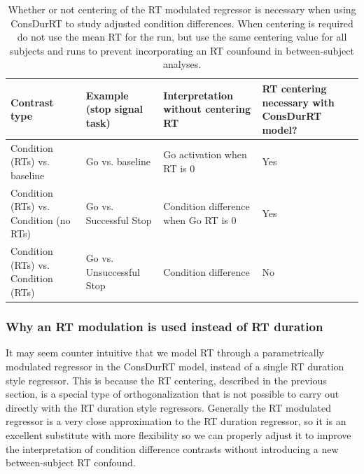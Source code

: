 \documentclass[titlepage,12pt] {article}
\begin{document}
\begin{table}[h!]
  \begin{center}
   \begin{tabular}{|L{4cm}|L{3.25cm}|L{3.9cm}|L{3.7cm}|} \hline
      Contrast type & Example  \newline (stop signal task) & Interpretation without centering RT & RT centering necessary with ConsDurRT model? \\ \hline\hline
      Condition (RTs) vs. baseline & Go  vs. \newline baseline & Go activation when RT is 0 & Yes \\ \hline
      Condition (RTs) vs. Condition (no RTs) & Go vs. \newline  Successful Stop  & Condition difference when Go RT is 0 & Yes \\ \hline
      Condition (RTs) vs. Condition (RTs) & Go vs. \newline  Unsuccessful Stop & Condition difference & No \\ \hline
    \end{tabular}
        \caption{Whether or not centering of the RT modulated regressor is necessary when using ConsDurRT to study adjusted condition differences.  When centering is required do not use the mean RT for the run, but use the same centering value for all subjects and runs to prevent incorporating an RT counfound in between-subject analyses.}\label{tab:centering-rt}
   \end{center}
 \end{table}


\subsubsection*{Why an RT modulation is used instead of RT duration}

It may seem counter intuitive that we model RT through a parametrically modulated regressor in the ConsDurRT model, instead of a single RT duration style regressor.  This is because the RT centering, described in the previous section, is a special type of orthogonalization that is not possible to carry out directly with the RT duration style regressors.  Generally the RT modulated regressor is a very close approximation to the RT duration regressor, so it is an excellent substitute with more flexibility so we can properly adjust it to improve the interpretation of condition difference contrasts without introducing a new between-subject RT confound.  
\end{document}
